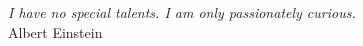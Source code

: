\thispagestyle{empty}

\vspace*{3cm}

\begin{flushright}{
		\slshape I have no special talents. I am only passionately curious.} \\ \medskip Albert Einstein
\end{flushright}

%
